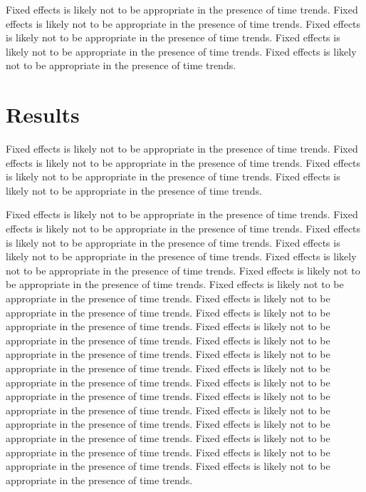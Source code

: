 \documentclass[11pt]{article}
\begin{document}
Fixed effects is likely not to be appropriate in the presence of time trends. 
Fixed effects is likely not to be appropriate in the presence of time trends. 
Fixed effects is likely not to be appropriate in the presence of time trends. 
Fixed effects is likely not to be appropriate in the presence of time trends. 
Fixed effects is likely not to be appropriate in the presence of time trends. 

\section{Results}

Fixed effects is likely not to be appropriate in the presence of time trends. 
Fixed effects is likely not to be appropriate in the presence of time trends. 
Fixed effects is likely not to be appropriate in the presence of time trends. 
Fixed effects is likely not to be appropriate in the presence of time trends. 

Fixed effects is likely not to be appropriate in the presence of time trends. 
Fixed effects is likely not to be appropriate in the presence of time trends. 
Fixed effects is likely not to be appropriate in the presence of time trends. 
Fixed effects is likely not to be appropriate in the presence of time trends. 
Fixed effects is likely not to be appropriate in the presence of time trends. 
Fixed effects is likely not to be appropriate in the presence of time trends. 
Fixed effects is likely not to be appropriate in the presence of time trends. 
Fixed effects is likely not to be appropriate in the presence of time trends. 
Fixed effects is likely not to be appropriate in the presence of time trends. 
Fixed effects is likely not to be appropriate in the presence of time trends. 
Fixed effects is likely not to be appropriate in the presence of time trends. 
Fixed effects is likely not to be appropriate in the presence of time trends. 
Fixed effects is likely not to be appropriate in the presence of time trends. 
Fixed effects is likely not to be appropriate in the presence of time trends. 
Fixed effects is likely not to be appropriate in the presence of time trends. 
Fixed effects is likely not to be appropriate in the presence of time trends. 
Fixed effects is likely not to be appropriate in the presence of time trends. 
Fixed effects is likely not to be appropriate in the presence of time trends. 
Fixed effects is likely not to be appropriate in the presence of time trends. 
Fixed effects is likely not to be appropriate in the presence of time trends. 
\end{document}
